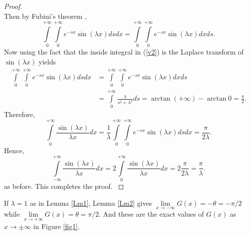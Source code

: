 \documentclass[smallextended]{svjour3}
\begin{document}
\begin{proof}
\begin{equation}
\label{v1}
\end{equation}
Then by Fubini's theorem \cite{B},
\begin{equation}
\int\limits_{0}^{+\infty}\int\limits_{0}^{+\infty}e^{-s x} {\sin{(\lambda x)
}}  ds dx=\int\limits_{0}^{+\infty}\int\limits_{0}^{+\infty}e^{-s x} {\sin{(\lambda x)}}  dx ds.
\label{v2}
\end{equation}
Now using the fact that the inside integral in (\ref{v2}) is the Laplace transform of $\sin{(\lambda x)}$ \cite{AS} yields
\begin{align}
\int\limits_{0}^{+\infty}\int\limits_{0}^{+\infty}e^{-s x} {\sin{(\lambda x)
}}ds dx&=\int\limits_{0}^{+\infty}\int\limits_{0}^{+\infty}e^{-s x} {\sin{(\lambda x)}}  dx ds \nonumber \\
& =\int\limits_{0}^{+\infty}\frac{\lambda}{s^2+\lambda^2}d s=\arctan{(+\infty)}-\arctan{0}=\frac{\pi}{2}.
\label{v3}
\end{align}
Therefore,
\begin{equation}
\int\limits_{0}^{+\infty} \frac{\sin{(\lambda x)
}}{\lambda x} dx=\frac{1}{\lambda}\int\limits_{0}^{+\infty}\int\limits_{0}^{+\infty}e^{-s x} {\sin{(\lambda x)}} ds dx=\frac{\pi}{2\lambda}.
\end{equation}
Hence, \begin{equation}
\int\limits_{-\infty}^{+\infty} \frac{\sin{(\lambda x)
}}{\lambda x} dx=2\int\limits_{0}^{+\infty} \frac{\sin{(\lambda x)
}}{\lambda x} dx=2\frac{\pi}{2\lambda}=\frac{\pi}{
\lambda}.
\end{equation}
as before. This completes the proof.
\label{lm1p}
\end{proof}

If $\lambda=1$ as in Lemma \ref{Lm1}, Lemma \ref{Lm2} gives $\lim\limits_{x\rightarrow-\infty}G(x)=-\theta=-\pi/2$ while $\lim\limits_{x\rightarrow+\infty}G(x)=\theta=\pi/2$. And these are the exact values of $G(x)$ as $x\rightarrow\pm \infty$ in Figure \ref{fig1}.
\end{document}
